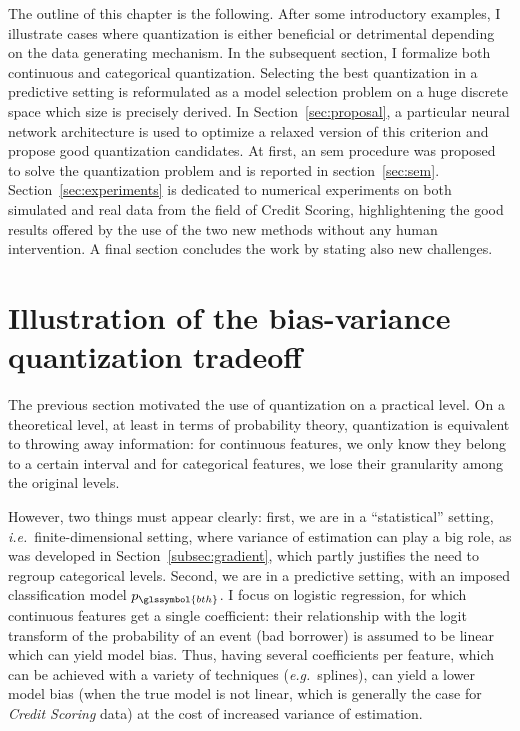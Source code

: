 The outline of this chapter is the following. After some introductory examples, I illustrate cases where quantization is either beneficial or detrimental depending on the data generating mechanism. In the subsequent section, I formalize both continuous and categorical quantization. Selecting the best quantization in a predictive setting is reformulated as a model selection problem on a huge discrete space which size is precisely derived. In Section~\ref{sec:proposal}, a particular neural network architecture is used to optimize a relaxed version of this criterion and propose good quantization candidates. At first, an \gls{sem} procedure was proposed to solve the quantization problem and is reported in section~\ref{sec:sem}. Section~\ref{sec:experiments} is dedicated to numerical experiments on both simulated and real data from the field of Credit Scoring, highlightening the good results offered by the use of the two new methods without any human intervention. A final section concludes the work by stating also new challenges.


\section{Illustration of the bias-variance quantization tradeoff} \label{sec:bias_variance_quant}
 

The previous section motivated the use of quantization on a practical level. On a theoretical level, at least in terms of probability theory, quantization is equivalent to throwing away information: for continuous features, we only know they belong to a certain interval and for categorical features, we lose their granularity among the original levels.

However, two things must appear clearly: first, we are in a ``statistical'' setting, \textit{i.e.}\ finite-dimensional setting, where variance of estimation can play a big role, as was developed in Section~\ref{subsec:gradient}, which partly justifies the need to regroup categorical levels. Second, we are in a predictive setting, with an imposed classification model $p_{\glssymbol{bth}}$. I focus on logistic regression, for which continuous features get a single coefficient: their relationship with the logit transform of the probability of an event (bad borrower) is assumed to be linear which can yield model bias. Thus, having several coefficients per feature, which can be achieved with a  variety of techniques (\textit{e.g.}\ splines), can yield a lower model bias (when the true model is not linear, which is generally the case for \textit{Credit Scoring} data) at the cost of increased variance of estimation.

